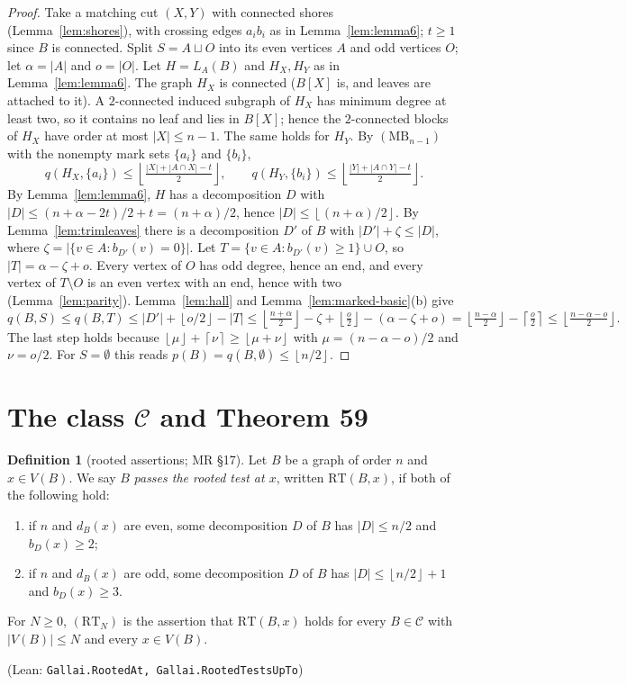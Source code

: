 \documentclass[11pt]{amsart}
\theoremstyle{definition}
\newtheorem{definition}[theorem]{Definition}
\theoremstyle{remark}
\renewcommand{\_}{\oldunderscore\allowbreak}
\newcommand{\leanst}[1]{\par{\raggedright\small\textup{(Lean: \texttt{#1})}\par}}
\newcommand{\cC}{\mathcal{C}}
\newcommand{\fl}[1]{\left\lfloor #1\right\rfloor}
\newcommand{\cl}[1]{\left\lceil #1\right\rceil}
\newcommand{\MBU}{\mathrm{MB}}
\newcommand{\RT}{\mathrm{RT}}
\begin{document}
\begin{proof}
Take a matching cut $(X,Y)$ with connected shores (Lemma~\ref{lem:shores}), with crossing edges
$a_ib_i$ as in Lemma~\ref{lem:lemma6}; $t\ge1$ since $B$ is connected. Split $S=A\sqcup O$ into its
even vertices $A$ and odd vertices $O$; let $\alpha=|A|$ and $o=|O|$. Let $H=L_A(B)$ and $H_X,H_Y$ as in
Lemma~\ref{lem:lemma6}. The graph $H_X$ is connected ($B[X]$ is, and leaves are attached to it). A
$2$-connected induced subgraph of $H_X$ has minimum degree at least two, so it contains no leaf and
lies in $B[X]$; hence the $2$-connected blocks of $H_X$ have order at most $|X|\le n-1$. The same holds
for $H_Y$. By $(\MBU_{n-1})$ with the nonempty mark sets $\{a_i\}$ and $\{b_i\}$,
\[
q(H_X,\{a_i\})\le\fl{\tfrac{|X|+|A\cap X|-t}2},\qquad q(H_Y,\{b_i\})\le\fl{\tfrac{|Y|+|A\cap Y|-t}2}.
\]
By Lemma~\ref{lem:lemma6}, $H$ has a decomposition $D$ with
$|D|\le(n+\alpha-2t)/2+t=(n+\alpha)/2$, hence $|D|\le\fl{(n+\alpha)/2}$. By
Lemma~\ref{lem:trimleaves} there is a decomposition $D'$ of $B$ with $|D'|+\zeta\le|D|$, where
$\zeta=|\{v\in A:b_{D'}(v)=0\}|$. Let $T=\{v\in A:b_{D'}(v)\ge1\}\cup O$, so
$|T|=\alpha-\zeta+o$. Every vertex of $O$ has odd degree, hence an end, and every vertex of $T\setminus O$ is
an even vertex with an end, hence with two (Lemma~\ref{lem:parity}). Lemma~\ref{lem:hall} and
Lemma~\ref{lem:marked-basic}(b) give
\[
q(B,S)\le q(B,T)\le|D'|+\fl{o/2}-|T|\le\fl{\tfrac{n+\alpha}2}-\zeta+\fl{\tfrac o2}-(\alpha-\zeta+o)
=\fl{\tfrac{n-\alpha}2}-\cl{\tfrac o2}\le\fl{\tfrac{n-\alpha-o}2}.
\]
The last step holds because $\fl{\mu}+\cl{\nu}\ge\fl{\mu+\nu}$ with $\mu=(n-\alpha-o)/2$ and
$\nu=o/2$. For $S=\emptyset$ this reads $p(B)=q(B,\emptyset)\le\fl{n/2}$.
\end{proof}

\section{The class \texorpdfstring{$\cC$}{C} and Theorem 59}\label{sec:thm59}

\begin{definition}[rooted assertions; MR \S17]\label{def:rooted}
Let $B$ be a graph of order $n$ and $x\in V(B)$. We say $B$ \emph{passes the rooted test at $x$},
written $\RT(B,x)$, if both of the following hold:
\begin{enumerate}[label=\textup{(R\arabic*)},leftmargin=3em]
\item if $n$ and $d_B(x)$ are even, some decomposition $D$ of $B$ has $|D|\le n/2$ and $b_D(x)\ge2$;
\item if $n$ and $d_B(x)$ are odd, some decomposition $D$ of $B$ has $|D|\le\fl{n/2}+1$ and
$b_D(x)\ge3$.
\end{enumerate}
For $N\ge0$, $(\RT_N)$ is the assertion that $\RT(B,x)$ holds for every $B\in\cC$ with
$|V(B)|\le N$ and every $x\in V(B)$.
\leanst{Gallai.RootedAt, Gallai.RootedTestsUpTo}
\end{definition}
\end{document}
